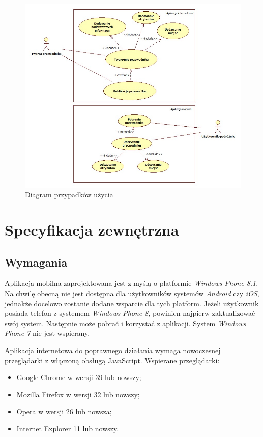 \documentclass[a4paper]{book}
\begin{document}
		\begin{figure}		
			\centering
			\includegraphics[width=1.0\textwidth]{images/usecase.jpg}
			\caption{Diagram przypadków użycia}
			\label{fig:usecase}
		\end{figure}
		
		
	\chapter{Specyfikacja zewnętrzna}
	\label{id:cha:specyfikacja_zewnetrzna}
		\section{Wymagania}
		\label{id:sec:wymagania}
		Aplikacja mobilna zaprojektowana jest z myślą o platformie \emph{Windows Phone 8.1}. Na chwilę obecną nie jest dostępna dla użytkowników systemów \emph{Android} czy \emph{iOS}, jednakże docelowo zostanie dodane wsparcie dla tych platform. Jeżeli użytkownik posiada telefon z systemem \emph{Windows Phone 8}, powinien najpierw zaktualizować swój system. Następnie może pobrać i korzystać z aplikacji. System \emph{Windows Phone 7} nie jest wspierany.
		
		Aplikacja internetowa do poprawnego działania wymaga nowoczesnej przeglądarki z włączoną obsługą JavaScript. Wspierane przeglądarki:
		\begin{itemize}
			\item Google Chrome w wersji 39 lub nowszy;
			\item Mozilla Firefox w wersji 32 lub nowszy;
			\item Opera w wersji 26 lub nowsza;
			\item Internet Explorer 11 lub nowszy.
		\end{itemize}
		
\end{document}
